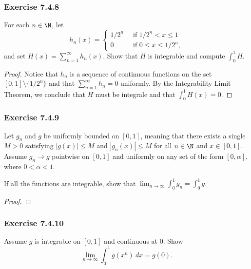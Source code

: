 \subsubsection{Exercise 7.4.8} For each \( n \in \N  \), let 
\[  h_{n}(x) = 
\begin{cases}
	1 / 2^{n} \ &\text{ if } 1/2^{n} < x \leq 1 \\
	0 \ &\text{ if } 0 \leq x \leq 1 / 2^{n},
\end{cases} \]
and set \( H(x) = \sum_{ n=1 }^{ \infty  } h_{n}(x)  \). Show that \( H  \) is integrable and compute \( \int_{ 0 }^{ 1 } H  \).
\begin{proof}
	Notice that \( h_{n}  \) is a sequence of continuous functions on the set \( [0,1] \setminus \{  1 / 2^{n}\}  \) and that \( \sum_{ n=1 }^{ \infty  } h_{n} = 0  \) uniformly.  By the Integrability Limit Theorem, we conclude that \( H  \) must be integrale and that \( \int_{ 0 }^{ 1 } H(x) = 0  \). 
\end{proof}

\subsubsection{Exercise 7.4.9} Let \( g_{n}  \) and \( g  \) be uniformly bounded on \( [0,1]  \), meaning that there exists a single \( M > 0  \) satisfying \( | g(x) | \leq M  \) and \( | g_{n}(x)  | \leq M  \) for all \( n \in \N  \) and \( x \in [0,1] \). Assume \( g_{n} \to g  \) pointwise on \( [0,1]  \) and uniformly on any set of the form \( [0, \alpha]  \), where \( 0 < \alpha < 1  \). 

If all the functions are integrable, show that \( \lim_{ n \to \infty  }  \int_{ 0 }^{ 1 } g_{n} = \int_{ 0 }^{ 1 } g  \).
\begin{proof}

\end{proof}


\subsubsection{Exercise 7.4.10} Assume \( g  \) is integrable on \( [0,1]  \) and continuous at \( 0  \). Show 
\[  \lim_{ n \to \infty  } \int_{ 0 }^{ 1 }  g(x^{n}) \ dx = g(0). \]




